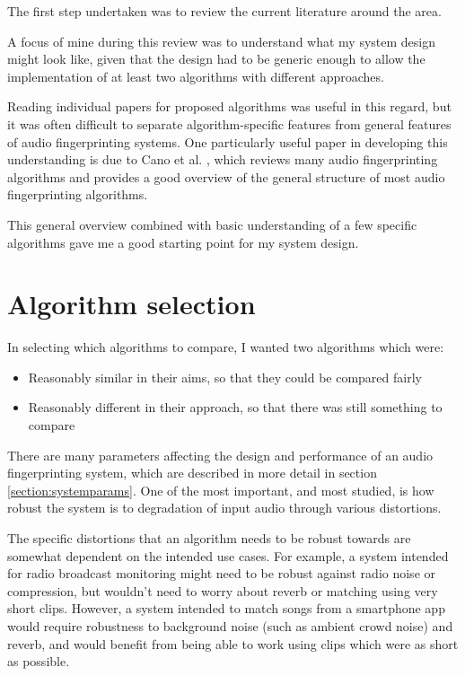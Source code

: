 \documentclass[12pt,a4paper,twoside,openright]{report}
\begin{document}
The first step undertaken was to review the current literature around the area.

A focus of mine during this review was to understand what my system design might look like, given that the design had to be generic enough to allow the implementation of at least two algorithms with different approaches. 

Reading individual papers for proposed algorithms was useful in this regard, but it was often difficult to separate algorithm-specific features from general features of audio fingerprinting systems. One particularly useful paper in developing this understanding is due to Cano et al. \cite{Cano02}, which reviews many audio fingerprinting algorithms and provides a good overview of the general structure of most audio fingerprinting algorithms. 

This general overview combined with basic understanding of a few specific algorithms gave me a good starting point for my system design.


\section{Algorithm selection}
\label{section:algoselection}

In selecting which algorithms to compare, I wanted two algorithms which were:

\begin{itemize}
  \item Reasonably similar in their aims, so that they could be compared fairly
  \item Reasonably different in their approach, so that there was still something to compare
\end{itemize}

There are many parameters affecting the design and performance of an audio fingerprinting system, which are described in more detail in section \ref{section:systemparams}. One of the most important, and most studied, is how robust the system is to degradation of input audio through various distortions. 

The specific distortions that an algorithm needs to be robust towards are somewhat dependent on the intended use cases. For example, a system intended for radio broadcast monitoring might need to be robust against radio noise or compression, but wouldn't need to worry about reverb or matching using very short clips. However, a system intended to match songs from a smartphone app would require robustness to background noise (such as ambient crowd noise) and reverb, and would benefit from being able to work using clips which were as short as possible.
\end{document}
